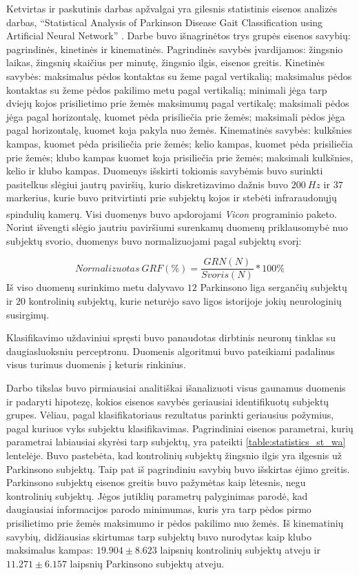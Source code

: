 \documentclass[]{vgtuef}
\begin{document}
Ketvirtas ir paskutinis darbas apžvalgai yra gilesnis statistinis eisenos analizės darbas, ``Statistical Analysis of Parkinson Disease Gait Classification using Artificial Neural Network'' \cite{6151536}. Darbe buvo išnagrinėtos trys grupės eisenos savybių: pagrindinės, kinetinės ir kinematinės. Pagrindinės savybės įvardijamos: žingsnio laikas, žingsnių skaičius per minutę, žingsnio ilgis, eisenos greitis. Kinetinės savybės: maksimalus pėdos kontaktas su žeme pagal vertikalią; maksimalus pėdos kontaktas su žeme pėdos pakilimo metu pagal vertikalią; minimali jėga tarp dviejų kojos prisilietimo prie žemės maksimumų pagal vertikalę; maksimali pėdos jėga pagal horizontalę, kuomet pėda prisiliečia prie žemės; maksimali pėdos jėga pagal horizontalę, kuomet koja pakyla nuo žemės. Kinematinės savybės: kulkšnies kampas, kuomet pėda prisiliečia prie žemės; kelio kampas, kuomet pėda prisiliečia prie žemės; klubo kampas kuomet koja prisiliečia prie žemės; maksimali kulkšnies, kelio ir klubo kampas. Duomenys išskirti tokiomis savybėmis buvo surinkti pasitelkus slėgiui jautrų paviršių, kurio diskretizavimo dažnis buvo $200~Hz$ ir $37$ markerius, kurie buvo pritvirtinti prie subjektų kojos ir stebėti infraraudonųjų spindulių kamerų. Visi duomenys buvo apdorojami \textit{Vicon\textsuperscript{\textregistered}} programinio paketo. Norint išvengti slėgio jautriu paviršiumi surenkamų duomenų priklausomybė nuo subjektų svorio, duomenys buvo normalizuojami pagal subjektų svorį:

\begin{equation}
Normalizuotas~GRF(\%) = \frac{GRN(N)}{Svoris (N)} * 100\%
\end{equation}
Iš viso duomenų surinkimo metu dalyvavo $12$ Parkinsono liga sergančių subjektų ir $20$ kontrolinių subjektų, kurie neturėjo savo ligos istorijoje jokių neurologinių susirgimų.

Klasifikavimo uždaviniui spręsti buvo panaudotas dirbtinis neuronų tinklas su daugiasluoksniu perceptronu. Duomenis algoritmui buvo pateikiami padalinus visus turimus duomenis į keturis rinkinius.

Darbo tikslas buvo pirmiausiai analitiškai išanalizuoti visus gaunamus duomenis ir padaryti hipotezę, kokios eisenos savybės geriausiai identifikuotų subjektų grupes. Vėliau, pagal klasifikatoriaus rezultatus parinkti geriausius požymius, pagal kuriuos vyks subjektu klasifikavimas. Pagrindiniai eisenos parametrai, kurių parametrai labiausiai skyrėsi tarp subjektų, yra pateikti \ref{table:statistics_st_wa} lentelėje. Buvo pastebėta, kad kontrolinių subjektų žingsnio ilgis yra ilgesnis už Parkinsono subjektų. Taip pat iš pagrindiniu savybių buvo išskirtas ėjimo greitis. Parkinsono subjektų eisenos greitis buvo pažymėtas kaip lėtesnis, negu kontrolinių subjektų. Jėgos jutiklių parametrų palyginimas parodė, kad daugiausiai informacijos parodo minimumas, kuris yra tarp pėdos pirmo prisilietimo prie žemės maksimumo ir pėdos pakilimo nuo žemės. Iš kinematinių savybių, didžiausias skirtumas tarp subjektų buvo nurodytas kaip klubo maksimalus kampas: $19.904\pm8.623$ laipsnių kontrolinių subjektų atveju ir $11.271\pm6.157$ laipsnių Parkinsono subjektų atveju.
\end{document}
